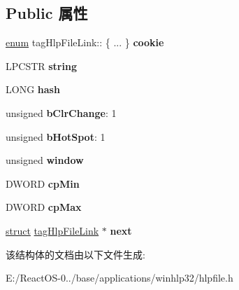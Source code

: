 \subsection*{Public 属性}
\begin{DoxyCompactItemize}
\item 
\mbox{\label{structtag_hlp_file_link_a810b8bf2503f823cc771bc657b9654bc}} 
\hyperlink{interfaceenum}{enum} tag\+Hlp\+File\+Link\+:: \{ ... \}  {\bfseries cookie}
\item 
\mbox{\label{structtag_hlp_file_link_acd9970f5e0155880229b6b82dc87b5dd}} 
L\+P\+C\+S\+TR {\bfseries string}
\item 
\mbox{\label{structtag_hlp_file_link_a1b73fd0f027786047164833e91e9c9c6}} 
L\+O\+NG {\bfseries hash}
\item 
\mbox{\label{structtag_hlp_file_link_a0ac38186745771b7b4017324d98189eb}} 
unsigned {\bfseries b\+Clr\+Change}\+: 1
\item 
\mbox{\label{structtag_hlp_file_link_a9e66118d07b0de68306c3546e6d2ef21}} 
unsigned {\bfseries b\+Hot\+Spot}\+: 1
\item 
\mbox{\label{structtag_hlp_file_link_a6e461e08e808bb734f29090cad7470e2}} 
unsigned {\bfseries window}
\item 
\mbox{\label{structtag_hlp_file_link_aad00185429991b646e74ac3202e46663}} 
D\+W\+O\+RD {\bfseries cp\+Min}
\item 
\mbox{\label{structtag_hlp_file_link_a379d71c0b0746e21f406e60e86f3c843}} 
D\+W\+O\+RD {\bfseries cp\+Max}
\item 
\mbox{\label{structtag_hlp_file_link_a361f647888dc81adcaff43e05ce08aeb}} 
\hyperlink{interfacestruct}{struct} \hyperlink{structtag_hlp_file_link}{tag\+Hlp\+File\+Link} $\ast$ {\bfseries next}
\end{DoxyCompactItemize}


该结构体的文档由以下文件生成\+:\begin{DoxyCompactItemize}
\item 
E\+:/\+React\+O\+S-\/0../base/applications/winhlp32/hlpfile.\+h\end{DoxyCompactItemize}
